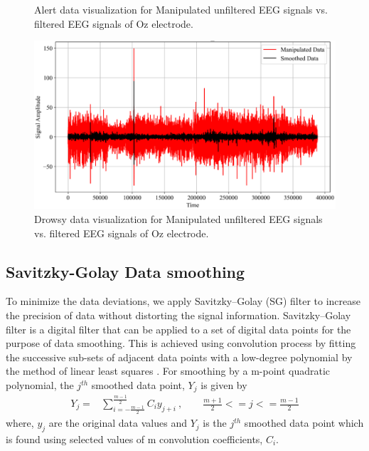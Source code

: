 \documentclass{IEEE_lsens}
\begin{document}
\begin{figure}[t!]
\centering
\lfbox[margin=0mm,border-style=none,padding=0mm,vertical-align=top]%
\vspace{-0.2cm}
\caption{\scriptsize Alert data visualization for Manipulated unfiltered EEG signals vs. filtered EEG signals of Oz electrode.
\label{Fig_data_smooth_alert}}
\end{figure}
\begin{figure}[t!]
\centering
\includegraphics[width=16cm,keepaspectratio=true]{Fig_data_smooth_drowsy.png}
\vspace{-0.2cm}
\caption{\scriptsize Drowsy data visualization for Manipulated unfiltered EEG signals vs. filtered EEG signals of Oz electrode.
\label{Fig_data_smooth_drowsy}}
\end{figure}
\subsection{Savitzky-Golay Data smoothing}
\vspace{-0.18cm}
To minimize the data deviations, we apply Savitzky–Golay (SG) filter to increase the precision of data without distorting the signal information. Savitzky–Golay filter is a digital filter that can be applied to a set of digital data points for the purpose of data smoothing. This is achieved using convolution process by fitting the successive sub-sets of adjacent data points with a low-degree polynomial by the method of linear least squares \cite{}. For smoothing by a m-point quadratic polynomial, the 
$j^{th}$ smoothed data point, $Y_j$ is given by
\vspace{-0.18cm}
\begin{eqnarray}
Y_{j}=&\sum^{\frac{m-1}{2}}_{i=-\frac{m-1}{2}} C_{i}y_{j+i} \label{eq_LOES}~,~~~~~~~~~\frac{m+1}{2}<= j<= \frac{m-1}{2}
\end{eqnarray}
where, $y_j$ are the original data values and $Y_j$ is the $j^{th}$ smoothed data point which is found using selected values of m convolution coefficients, 
$C_i$. 
\end{document}
